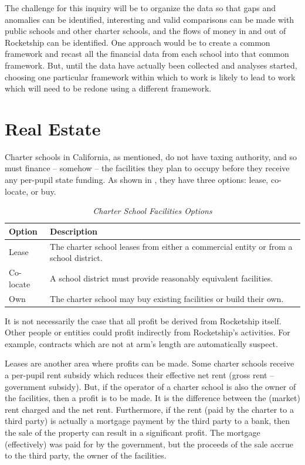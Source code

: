 The challenge for this inquiry will be to organize the data so that gaps and anomalies can be identified, interesting and valid comparisons can be made with public schools and other charter schools, and the flows of money in and out of Rocketship can be identified. One approach would be to create a common framework and recast all the financial data from each school into that common framework. But, until the data have actually been collected and analyses started, choosing one particular framework within which to work is likely to lead to work which will need to be redone using a different framework.


\section{Real Estate}\label{sec:real-estate}\indent

Charter schools in California, as mentioned, do not have taxing authority, and so must finance – somehow – the facilities they plan to occupy before they receive any per-pupil state funding. As shown in , they have three options: lease, co-locate, or buy.

\begin{table}[htb]
  \centering\small%
  \caption[Charter School Facilities Options]{\textit{Charter School Facilities Options}}\label{tab:charter-facilities-options}%
  \begin{tabular}{ll}
    \toprule%
    Option    & Description \\
    \midrule%
    Lease     & The charter school leases from either a commercial entity or from a school district. \\
    Co-locate & A school district must provide reasonably equivalent facilities. \\
    Own       & The charter school may buy existing facilities or build their own. \\
    \bottomrule%
  \end{tabular}
\end{table}%


It is not necessarily the case that all profit be derived from Rocketship itself. Other people or entities could profit indirectly from Rocketship's activities. For example, contracts which are not at arm's length are automatically suspect.

Leases are another area where profits can be made. Some charter schools receive a per-pupil rent subsidy which reduces their effective net rent (gross rent – government subsidy). But, if the operator of a charter school is also the owner of the facilities, then a profit is to be made. It is the difference between the (market) rent charged and the net rent.  Furthermore, if the rent (paid by the charter to a third party) is actually a mortgage payment by the third party to a bank, then the sale of the property can result in a significant profit. The mortgage (effectively) was paid for by the government, but the proceeds of the sale accrue to the third party, the owner of the facilities.

